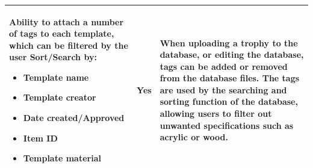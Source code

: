 \documentclass[oneside,openany,11pt,a4paper]{report}
\begin{document}
\begin{longtable}{|p{4cm}|p{2cm}|p{8cm}|}
	Ability to attach a number of tags to each template, which can be filtered by the user
	Sort/Search by:
		\begin{itemize}
		\itemsep0em
		\item Template name
		\item Template creator
		\item Date created/Approved
		\item Item ID
		\item Template material
	\end{itemize} & 
	Yes &
	When uploading a trophy to the database, or editing the database, tags can be added or removed from the database files. The tags are used by the searching and sorting function of the database, allowing users to filter out unwanted specifications such as acrylic or wood.
	\\ \hline
	

\end{longtable}
\end{document}
